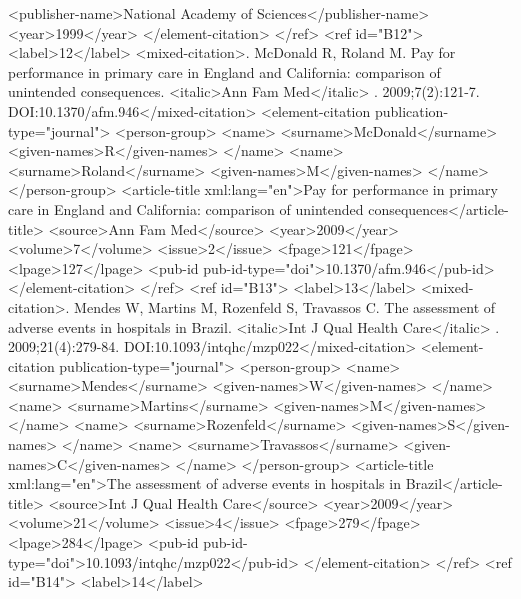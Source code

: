           <publisher-name>National Academy of Sciences</publisher-name>
          <year>1999</year>
        </element-citation>
      </ref>
      <ref id="B12">
        <label>12</label>
        <mixed-citation>. McDonald R, Roland M. Pay for performance in primary care in England and
          California: comparison of unintended consequences. <italic>Ann Fam Med</italic> .
          2009;7(2):121-7. DOI:10.1370/afm.946</mixed-citation>
        <element-citation publication-type="journal">
          <person-group>
            <name>
              <surname>McDonald</surname>
              <given-names>R</given-names>
            </name>
            <name>
              <surname>Roland</surname>
              <given-names>M</given-names>
            </name>
          </person-group>
          <article-title xml:lang="en">Pay for performance in primary care in England and
            California: comparison of unintended consequences</article-title>
          <source>Ann Fam Med</source>
          <year>2009</year>
          <volume>7</volume>
          <issue>2</issue>
          <fpage>121</fpage>
          <lpage>127</lpage>
          <pub-id pub-id-type="doi">10.1370/afm.946</pub-id>
        </element-citation>
      </ref>
      <ref id="B13">
        <label>13</label>
        <mixed-citation>. Mendes W, Martins M, Rozenfeld S, Travassos C. The assessment of adverse
          events in hospitals in Brazil. <italic>Int J Qual Health Care</italic> .
          2009;21(4):279-84. DOI:10.1093/intqhc/mzp022</mixed-citation>
        <element-citation publication-type="journal">
          <person-group>
            <name>
              <surname>Mendes</surname>
              <given-names>W</given-names>
            </name>
            <name>
              <surname>Martins</surname>
              <given-names>M</given-names>
            </name>
            <name>
              <surname>Rozenfeld</surname>
              <given-names>S</given-names>
            </name>
            <name>
              <surname>Travassos</surname>
              <given-names>C</given-names>
            </name>
          </person-group>
          <article-title xml:lang="en">The assessment of adverse events in hospitals in
            Brazil</article-title>
          <source>Int J Qual Health Care</source>
          <year>2009</year>
          <volume>21</volume>
          <issue>4</issue>
          <fpage>279</fpage>
          <lpage>284</lpage>
          <pub-id pub-id-type="doi">10.1093/intqhc/mzp022</pub-id>
        </element-citation>
      </ref>
      <ref id="B14">
        <label>14</label>
